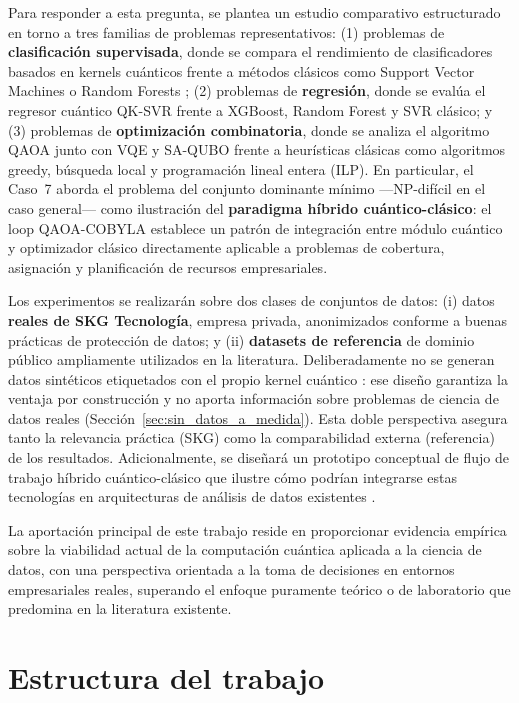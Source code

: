 Para responder a esta pregunta, se plantea un estudio comparativo estructurado en torno a tres familias de problemas representativos: (1) problemas de \textbf{clasificación supervisada}, donde se compara el rendimiento de clasificadores basados en kernels cuánticos frente a métodos clásicos como Support Vector Machines \citep{cortes1995} o Random Forests \citep{breiman2001}; (2) problemas de \textbf{regresión}, donde se evalúa el regresor cuántico QK-SVR frente a XGBoost, Random Forest y SVR clásico; y (3) problemas de \textbf{optimización combinatoria}, donde se analiza el algoritmo QAOA \citep{farhi2014} junto con VQE y SA-QUBO frente a heurísticas clásicas como algoritmos greedy, búsqueda local y programación lineal entera (ILP). En particular, el Caso~7 aborda el problema del conjunto dominante mínimo ---NP-difícil en el caso general--- como ilustración del \textbf{paradigma híbrido cuántico-clásico}: el loop QAOA-COBYLA establece un patrón de integración entre módulo cuántico y optimizador clásico directamente aplicable a problemas de cobertura, asignación y planificación de recursos empresariales.

Los experimentos se realizarán sobre dos clases de conjuntos de datos: (i) datos \textbf{reales de SKG Tecnología}, empresa privada, anonimizados conforme a buenas prácticas de protección de datos; y (ii) \textbf{datasets de referencia} de dominio público ampliamente utilizados en la literatura. Deliberadamente no se generan datos sintéticos etiquetados con el propio kernel cuántico \citep[como en][]{havlicek2019, huang2021}: ese diseño garantiza la ventaja por construcción y no aporta información sobre problemas de ciencia de datos reales (Sección~\ref{sec:sin_datos_a_medida}). Esta doble perspectiva asegura tanto la relevancia práctica (SKG) como la comparabilidad externa (referencia) de los resultados. Adicionalmente, se diseñará un prototipo conceptual de flujo de trabajo híbrido cuántico-clásico que ilustre cómo podrían integrarse estas tecnologías en arquitecturas de análisis de datos existentes \citep{cerezo2021}.

La aportación principal de este trabajo reside en proporcionar evidencia empírica sobre la viabilidad actual de la computación cuántica aplicada a la ciencia de datos, con una perspectiva orientada a la toma de decisiones en entornos empresariales reales, superando el enfoque puramente teórico o de laboratorio que predomina en la literatura existente.

\section{Estructura del trabajo}

